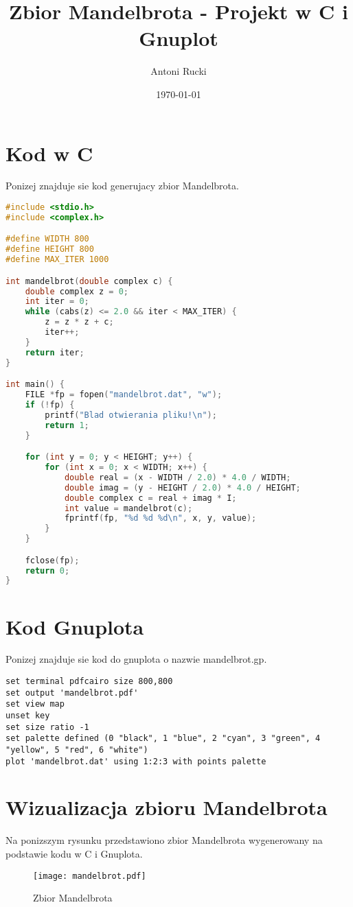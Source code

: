 \documentclass{article}
\title{Zbior Mandelbrota - Projekt w C i Gnuplot}
\author{Antoni Rucki}
\date{\today}
\begin{document}
\maketitle
\tableofcontents
\newpage
\section{Kod w C}
Ponizej znajduje sie kod generujacy zbior Mandelbrota.

\begin{lstlisting}[language=C, caption=Kod programu Mandelbrota]
#include <stdio.h>
#include <complex.h>

#define WIDTH 800
#define HEIGHT 800
#define MAX_ITER 1000

int mandelbrot(double complex c) {
    double complex z = 0;
    int iter = 0;
    while (cabs(z) <= 2.0 && iter < MAX_ITER) {
        z = z * z + c;
        iter++;
    }
    return iter;
}

int main() {
    FILE *fp = fopen("mandelbrot.dat", "w");
    if (!fp) {
        printf("Blad otwierania pliku!\n");
        return 1;
    }

    for (int y = 0; y < HEIGHT; y++) {
        for (int x = 0; x < WIDTH; x++) {
            double real = (x - WIDTH / 2.0) * 4.0 / WIDTH;
            double imag = (y - HEIGHT / 2.0) * 4.0 / HEIGHT;
            double complex c = real + imag * I;
            int value = mandelbrot(c);
            fprintf(fp, "%d %d %d\n", x, y, value);
        }
    }

    fclose(fp);
    return 0;
}
\end{lstlisting}

\newpage
\section{Kod Gnuplota}
Ponizej znajduje sie kod do gnuplota o nazwie mandelbrot.gp.
\begin{lstlisting}[language=Gnuplot, caption=Kod Gnuplota]
set terminal pdfcairo size 800,800
set output 'mandelbrot.pdf'
set view map
unset key
set size ratio -1
set palette defined (0 "black", 1 "blue", 2 "cyan", 3 "green", 4 "yellow", 5 "red", 6 "white")
plot 'mandelbrot.dat' using 1:2:3 with points palette
\end{lstlisting}

\newpage
\section{Wizualizacja zbioru Mandelbrota}
Na ponizszym rysunku przedstawiono zbior Mandelbrota wygenerowany na podstawie kodu w C i Gnuplota.

\begin{figure}[h]
    \centering
    \texttt{[image: mandelbrot.pdf]}
    \caption{Zbior Mandelbrota}
    \label{fig:mandelbrot}
\end{figure}
\end{document}
